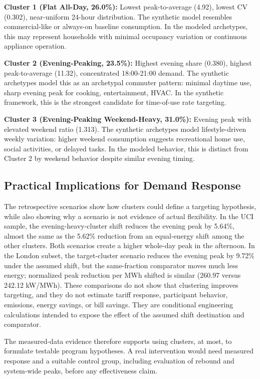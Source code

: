 \documentclass[11pt,a4paper]{article}
\begin{document}
\textbf{Cluster 1 (Flat All-Day, 26.0\%):} Lowest peak-to-average (4.92), lowest CV (0.302), near-uniform 24-hour distribution. The synthetic model resembles commercial-like or always-on baseline consumption. In the modeled archetypes, this may represent households with minimal occupancy variation or continuous appliance operation.

\textbf{Cluster 2 (Evening-Peaking, 23.5\%):} Highest evening share (0.380), highest peak-to-average (11.32), concentrated 18:00-21:00 demand. The synthetic archetypes model this as an archetypal commuter pattern: minimal daytime use, sharp evening peak for cooking, entertainment, HVAC. In the synthetic framework, this is the strongest candidate for time-of-use rate targeting.

\textbf{Cluster 3 (Evening-Peaking Weekend-Heavy, 31.0\%):} Evening peak with elevated weekend ratio (1.313). The synthetic archetypes model lifestyle-driven weekly variation: higher weekend consumption suggests recreational home use, social activities, or delayed tasks. In the modeled behavior, this is distinct from Cluster 2 by weekend behavior despite similar evening timing.

\subsection{Practical Implications for Demand Response}

The retrospective scenarios show how clusters could define a targeting hypothesis, while also showing why a scenario is not evidence of actual flexibility. In the UCI sample, the evening-heavy-cluster shift reduces the evening peak by 5.64\%, almost the same as the 5.62\% reduction from an equal-energy shift among the other clusters. Both scenarios create a higher whole-day peak in the afternoon. In the London subset, the target-cluster scenario reduces the evening peak by 9.72\% under the assumed shift, but the same-fraction comparator moves much less energy; normalized peak reduction per MWh shifted is similar (260.97 versus 242.12 kW/MWh). These comparisons do not show that clustering improves targeting, and they do not estimate tariff response, participant behavior, emissions, energy savings, or bill savings. They are conditional engineering calculations intended to expose the effect of the assumed shift destination and comparator.

The measured-data evidence therefore supports using clusters, at most, to formulate testable program hypotheses. A real intervention would need measured response and a suitable control group, including evaluation of rebound and system-wide peaks, before any effectiveness claim.
\end{document}
